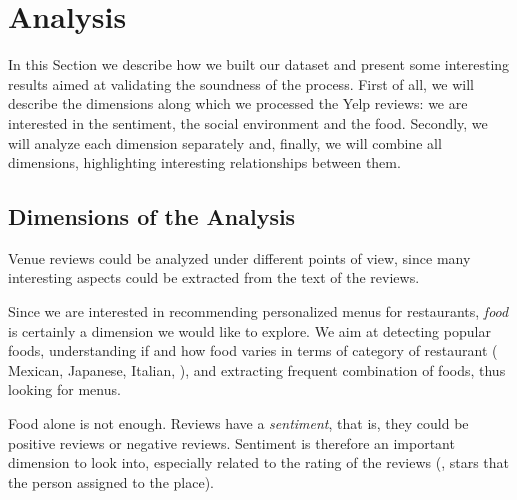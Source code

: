 \section{Analysis} \label{sec:analysis} 
% 
In this Section we describe how we built our dataset and present some interesting results aimed at validating the soundness of the process.
First of all, we will describe the dimensions along which we processed the Yelp reviews: we are interested in the sentiment, the social environment and the food.
Secondly, we will analyze each dimension separately and, finally, we will combine all dimensions, highlighting interesting relationships between them.

\subsection{Dimensions of the Analysis}
Venue reviews could be analyzed under different points of view, since many interesting aspects could be extracted from the text of the reviews. 

Since we are interested in recommending personalized menus for restaurants, \emph{food} is certainly a dimension we would like to explore. We aim at detecting popular foods, understanding if and how food varies in terms of category of restaurant (\eg\, Mexican, Japanese, Italian, \etc), and extracting frequent combination of foods, thus looking for menus.

Food alone is not enough. Reviews have a \emph{sentiment}, that is, they could be positive reviews or negative reviews. 
Sentiment is therefore an important dimension to look into, especially related to the rating of the reviews (\ie, stars that the person assigned to the place).

